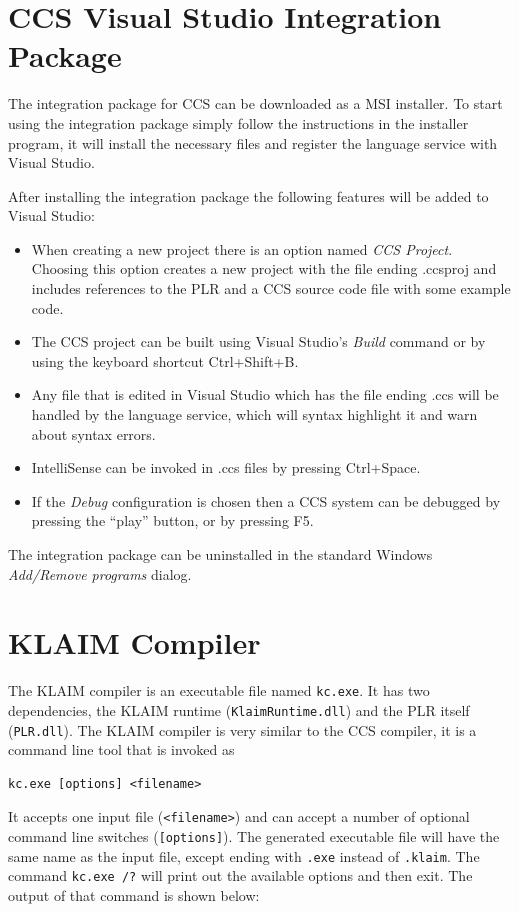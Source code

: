 \section{CCS Visual Studio Integration Package}

	The integration package for CCS can be downloaded as a MSI installer. To 
	start using the integration package simply follow the instructions in the 
	installer program, it will install the necessary files and register the 
	language service with Visual Studio. 
	
	After installing the integration package the following features will be 
	added to Visual Studio:
	
	\begin{itemize}
		\item When creating a new project there is an option named \textit{CCS 
		Project}. Choosing this option creates a new project with the file ending 
		.ccsproj and includes references to the PLR and a CCS source code file 
		with some example code.
		
		\item The CCS project can be built using Visual Studio's \textit{Build} 
		command or by using the keyboard shortcut Ctrl+Shift+B.
		
		\item Any file that is edited in Visual Studio which has the file ending 
		.ccs will be handled by the language service, which will syntax highlight 
		it and warn about syntax errors.
		
		\item IntelliSense can be invoked in .ccs files by pressing Ctrl+Space.
		
		\item If the \textit{Debug} configuration is chosen then a CCS 
		system can be debugged by pressing the ``play'' button, or by pressing F5.

	\end{itemize}
	
	The integration package can be uninstalled in the standard Windows 
	\textit{Add/Remove programs} dialog.
\newpage
\section{KLAIM Compiler}

  The KLAIM compiler is an executable file named \texttt{kc.exe}. It has two 
  dependencies, the KLAIM runtime (\texttt{KlaimRuntime.dll}) and the PLR 
  itself (\texttt{PLR.dll}). The KLAIM compiler is very similar to the CCS
  compiler, it is a command line tool that is invoked as
  \begin{verbatim}kc.exe [options] <filename>\end{verbatim} It accepts one 
  input file (\texttt{<filename>}) and can accept a number of optional command 
  line switches (\texttt{[options]}). The generated executable file 
  will have the same name as the input file, except ending with \texttt{.exe} 
  instead of \texttt{.klaim}. The command \texttt{kc.exe /?} will print out
  the available options and then exit. The output of that command is shown 
  below:

